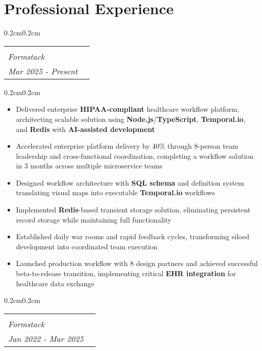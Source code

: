 \documentclass[10pt, letterpaper]{article}
\makeatletter
\newenvironment{highlights}{
    \begin{itemize}[
        topsep=0.10 cm,
        parsep=0.10 cm,
        partopsep=0pt,
        itemsep=0pt,
        leftmargin=0.4 cm + 10pt
    ]
}{
    \end{itemize}
}
\newenvironment{onecolentry}{
    \begin{adjustwidth}{0.2cm}{0.2cm}
}{
    \end{adjustwidth}
}
\newcommand{\jobentry}[4]{
    \begin{onecolentry}
        \noindent
        \begin{tabularx}{\textwidth}{@{}X>{\raggedleft\arraybackslash}p{3cm}@{\hspace{0.2cm}}}
            \begin{tabular}[t]{@{}l@{}}
                \textbf{#1}\\
                \textit{#2}
            \end{tabular} &
            \begin{tabular}[t]{@{}r@{}}
                #4\\
                \textit{#3}
            \end{tabular}
        \end{tabularx}
    \end{onecolentry}
}
\makeatother
\begin{document}
    \section{Professional Experience}
    
    \jobentry{Software Architect}{Formstack}{Mar 2025 - Present}{Remote}

    \vspace{0.10cm}
    \begin{onecolentry}
        \begin{highlights}
            \item Delivered enterprise \textbf{HIPAA-compliant} healthcare workflow platform, architecting scalable solution using \textbf{Node.js}/\textbf{TypeScript}, \textbf{Temporal.io}, and \textbf{Redis} with \textbf{AI-assisted development}
            \item Accelerated enterprise platform delivery by 40\% through 8-person team leadership and cross-functional coordination, completing a workflow solution in 3 months across multiple microservice teams
            \item Designed workflow architecture with \textbf{SQL schema} and definition system translating visual maps into executable \textbf{Temporal.io} workflows
            \item Implemented \textbf{Redis}-based transient storage solution, eliminating persistent record storage while maintaining full functionality
            \item Established daily war rooms and rapid feedback cycles, transforming siloed development into coordinated team execution
            \item Launched production workflow with 8 design partners and achieved successful beta-to-release transition, implementing critical \textbf{EHR integration} for healthcare data exchange
        \end{highlights}
    \end{onecolentry}
    
    \vspace{0.3cm}
    \jobentry{Principal Engineer}{Formstack}{Jan 2022 - Mar 2025}{Remote}
\end{document}
